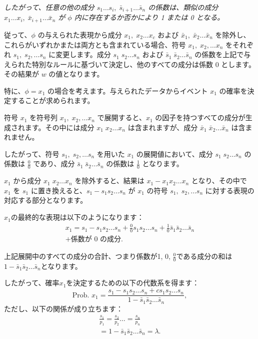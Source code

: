 \documentclass[a4paper,11pt,openany]{ltjsbook}
\begin{document}
\emph{したがって、任意の他の成分 $s_1 \dots s_i, \; \bar{s}_{i+1} \dots \bar{s}_n$ の係数は、類似の成分 $x_1 \dots x_i, \; \bar{x}_{i+1} \dots \bar{x}_n$ が $\phi$ 内に存在するか否かにより 1 または 0 となる。}

従って、$\phi$ の与えられた表現から成分 $x_1, \; x_2 \dots x_c$ および $\bar{x}_1, \; \bar{x}_2 \dots \bar{x}_n$ を除外し、これらがいずれかまたは両方とも含まれている場合、符号 $x_1, \; x_2, \dotsc x_n$ をそれぞれ $s_1, \; s_2, \dotsc s_n$ に変更します。成分 $s_1 \; s_2 \dots s_n$ および $\bar{s}_1 \; \bar{s}_2 \dots \bar{s}_n$ の係数を上記で与えられた特別なルールに基づいて決定し、他のすべての成分は係数 0 とします。その結果が $w$ の値となります。

特に、$\phi = x_1$ の場合を考えます。与えられたデータからイベント $x_1$ の確率を決定することが求められます。

符号 $x_1$ を符号列 $x_1, \; x_2, \dotsc x_n$ で展開すると、$x_1$ の因子を持つすべての成分が生成されます。その中には成分 $x_1 \; x_2 \dots x_n$ は含まれますが、成分 $\bar{x}_1 \; \bar{x}_2 \dots \bar{x}_n$ は含まれません。

したがって、符号 $s_1, \; s_2, \dotsc s_n$ を用いた $x_1$ の展開値において、成分 $s_1 \; s_2 \dots s_n$ の係数は $\frac{0}{0}$ であり、成分 $\bar{s}_1 \; \bar{s}_2 \dots \bar{s}_n$ の係数は $\frac{1}{0}$ となります。

$x_1$ から成分 $x_1 \; x_2 \dots x_n$ を除外すると、結果は $x_1 - x_1x_2 \dots x_n$ となり、その中で $x_1$ を $s_1$ に置き換えると、$s_1 - s_1s_2 \dots s_n$ が $x_1$ の符号 $s_1, \; s_2, \dotsc s_n$ に対する表現の対応する部分となります。

$x_1$の最終的な表現は以下のようになります：
\begin{equation*}
\begin{split}
  x_1 = s_1 - s_1s_2 \dotsc s_n
      + \frac{0}{0}s_1s_2 \dotsc s_n
      + \frac{1}{0}\bar{s}_1\bar{s}_2 \dotsc \bar{s}_n   \\
  + \text{係数が }0 \text{ の成分}.
\end{split}
  \tag{7}
\end{equation*}

上記展開中のすべての成分の合計、つまり係数が1, 0, $\frac{0}{0}$である成分の和は
$1 - \bar{s}_1\bar{s}_2 \dotsc \bar{s}_n$となります。

したがって、確率$x_1$を決定するための以下の代数系を得ます：
\[
  \text{Prob. }x_1 = \frac{s_1 - s_1s_2 \dotsc s_n + cs_1s_2 \dotsc s_n}{1 - \bar{s}_1\bar{s}_2 \dotsc \bar{s}_n},  \tag{8}
\]
ただし、以下の関係が成り立ちます：
\begin{equation*}
\begin{split}
  \frac{s_1}{p_1} = \frac{s_2}{p_2} \dotsc = \frac{s_n}{p_n}   \\
  = 1 - \bar{s}_1 \bar{s}_2 \dotsc \bar{s}_n = \lambda.
\end{split}
   \tag{9}
\end{equation*}
\end{document}

